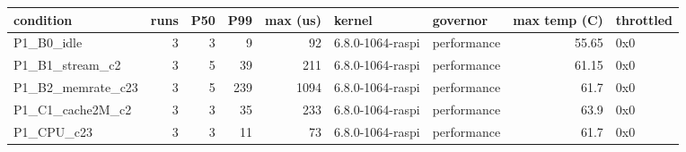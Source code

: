 \begin{tabular}{lrrrrllrl}
\toprule
condition & runs & P50 & P99 & max (us) & kernel & governor & max temp (C) & throttled \\
\midrule
P1\_B0\_idle & 3 & 3 & 9 & 92 & 6.8.0-1064-raspi & performance & 55.65 & 0x0 \\
P1\_B1\_stream\_c2 & 3 & 5 & 39 & 211 & 6.8.0-1064-raspi & performance & 61.15 & 0x0 \\
P1\_B2\_memrate\_c23 & 3 & 5 & 239 & 1094 & 6.8.0-1064-raspi & performance & 61.7 & 0x0 \\
P1\_C1\_cache2M\_c2 & 3 & 3 & 35 & 233 & 6.8.0-1064-raspi & performance & 63.9 & 0x0 \\
P1\_CPU\_c23 & 3 & 3 & 11 & 73 & 6.8.0-1064-raspi & performance & 61.7 & 0x0 \\
\bottomrule
\end{tabular}

